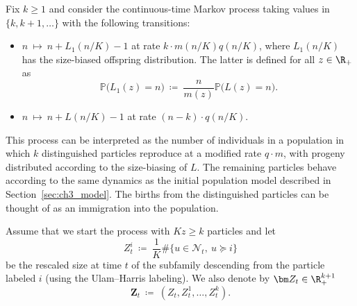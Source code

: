 \begin{refsegment}
\begin{defn}\label{def:spine}
   Fix $k\geqslant 1$ and consider the continuous-time Markov process taking
   values in $\{k, k+1, \ldots\}$ with the following transitions:
   \begin{itemize}
    \item $n\ \longmapsto\  n +  L_1(n/K) - 1$ at rate $k \cdot m(n/K)q(n/K)$, where $ L_1(n/K)$ has the size-biased offspring distribution. The latter is defined for all $z\in \R_+$ as \begin{equation}\label{eq:size_bias_distrib}
 \mathbb{P}\big(L_1(z)={n}\big)\ \coloneqq\ \frac{n}{m(z)}\mathbb{P}\big(L(z)=n\big).
\end{equation}
    \item $n\ \longmapsto\ n + L(n/K) - 1$   at rate $(n-k) \cdot q(n/K)$.
   \end{itemize}
\end{defn}
   
This process can be interpreted as the number of individuals in a
population in which $k$ distinguished particles reproduce at a modified
rate $q \cdot m$, with progeny distributed according to the size-biasing
of $L$. The remaining particles behave according to the same dynamics as
the initial population model described in Section~\ref{sec:ch3_model}. The births
from the distinguished particles can be thought of as an immigration into
the population.

Assume that we start the process with $Kz\geqslant k$ particles and let
\[
    Z^{i}_t\ \coloneqq\ \frac{1}{K}\#\{u\in\mathcal{N}_t,\  u\succcurlyeq i\}
\] 
be the rescaled size at time $t$ of the subfamily descending from the particle
labeled $i$ (using the Ulam--Harris labeling).  We also denote by $\bm Z_t\in \R_+^{k+1}$ 
\[
\bm Z_t\ \coloneqq\ (Z_t, Z^1_t,\ldots, Z^k_t).
\]


\end{refsegment}
